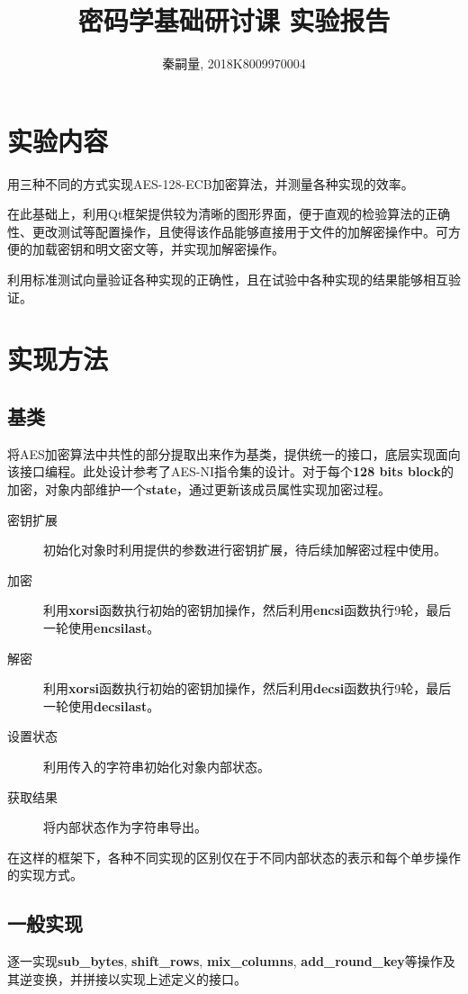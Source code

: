 \documentclass{article} %
\title{密码学基础研讨课 实验报告}
\author{秦嗣量, 2018K8009970004}
\begin{document}
\begin{CJK}{UTF8}{gbsn}
\maketitle
\section{实验内容}
用三种不同的方式实现AES-128-ECB加密算法，并测量各种实现的效率。

在此基础上，利用Qt框架提供较为清晰的图形界面，便于直观的检验算法的正确性、更改测试等配置操作，且使得该作品能够直接用于文件的加解密操作中。可方便的加载密钥和明文密文等，并实现加解密操作。

利用标准测试向量验证各种实现的正确性，且在试验中各种实现的结果能够相互验证。
\section{实现方法}
\subsection{基类}
将AES加密算法中共性的部分提取出来作为基类，提供统一的接口，底层实现面向该接口编程。此处设计参考了AES-NI指令集的设计。对于每个\textbf{128 bits block}的加密，对象内部维护一个\textbf{state}，通过更新该成员属性实现加密过程。

\begin{description}
  \item[密钥扩展] 初始化对象时利用提供的参数进行密钥扩展，待后续加解密过程中使用。
  \item[加密] 利用\textbf{xorsi}函数执行初始的密钥加操作，然后利用\textbf{encsi}函数执行9轮，最后一轮使用\textbf{encsilast}。
  \item[解密] 利用\textbf{xorsi}函数执行初始的密钥加操作，然后利用\textbf{decsi}函数执行9轮，最后一轮使用\textbf{decsilast}。
  \item[设置状态] 利用传入的字符串初始化对象内部状态。
  \item[获取结果] 将内部状态作为字符串导出。
\end{description}

在这样的框架下，各种不同实现的区别仅在于不同内部状态的表示和每个单步操作的实现方式。
\subsection{一般实现}
逐一实现\textbf{sub\_bytes}, \textbf{shift\_rows}, \textbf{mix\_columns}, \textbf{add\_round\_key}等操作及其逆变换，并拼接以实现上述定义的接口。

\end{CJK}
\end{document}

